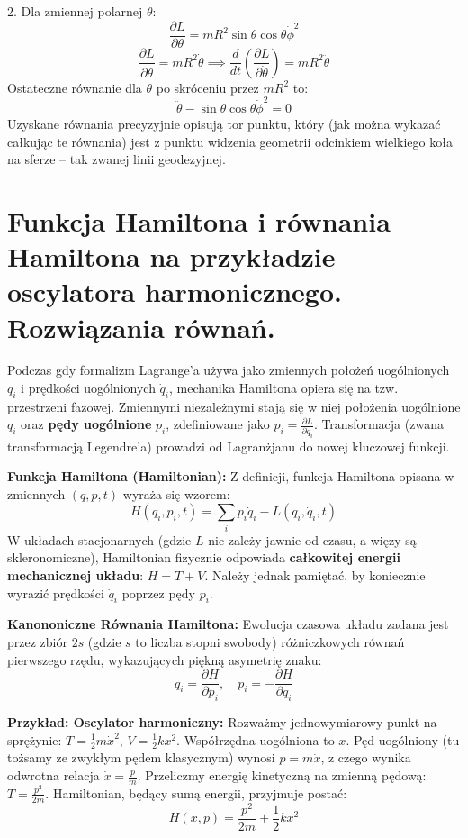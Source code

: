 \documentclass[11pt, a4paper]{article}
\begin{document}
2. Dla zmiennej polarnej $\theta$:
\[
\frac{\partial L}{\partial \theta} = m R^2 \sin\theta \cos\theta \dot{\phi}^2
\]
\[
\frac{\partial L}{\partial \dot{\theta}} = m R^2 \dot{\theta} \implies \frac{d}{dt}\left(\frac{\partial L}{\partial \dot{\theta}}\right) = m R^2 \ddot{\theta}
\]
Ostateczne równanie dla $\theta$ po skróceniu przez $mR^2$ to:
\[
\ddot{\theta} - \sin\theta \cos\theta \dot{\phi}^2 = 0
\]
Uzyskane równania precyzyjnie opisują tor punktu, który (jak można wykazać całkując te równania) jest z punktu widzenia geometrii odcinkiem wielkiego koła na sferze – tak zwanej linii geodezyjnej.

\section{Funkcja Hamiltona i równania Hamiltona na przykładzie oscylatora harmonicznego. Rozwiązania równań.}

Podczas gdy formalizm Lagrange'a używa jako zmiennych położeń uogólnionych $q_i$ i prędkości uogólnionych $\dot{q}_i$, mechanika Hamiltona opiera się na tzw. przestrzeni fazowej. Zmiennymi niezależnymi stają się w niej położenia uogólnione $q_i$ oraz \textbf{pędy uogólnione} $p_i$, zdefiniowane jako $p_i = \frac{\partial L}{\partial \dot{q}_i}$. Transformacja (zwana transformacją Legendre'a) prowadzi od Lagranżjanu do nowej kluczowej funkcji.

\textbf{Funkcja Hamiltona (Hamiltonian):}
Z definicji, funkcja Hamiltona opisana w zmiennych $(q, p, t)$ wyraża się wzorem:
\[
H(q_i, p_i, t) = \sum_i p_i \dot{q}_i - L(q_i, \dot{q}_i, t)
\]
W układach stacjonarnych (gdzie $L$ nie zależy jawnie od czasu, a więzy są skleronomiczne), Hamiltonian fizycznie odpowiada \textbf{całkowitej energii mechanicznej układu}: $H = T + V$. Należy jednak pamiętać, by koniecznie wyrazić prędkości $\dot{q}_i$ poprzez pędy $p_i$.

\textbf{Kanononiczne Równania Hamiltona:}
Ewolucja czasowa układu zadana jest przez zbiór $2s$ (gdzie $s$ to liczba stopni swobody) różniczkowych równań pierwszego rzędu, wykazujących piękną asymetrię znaku:
\[
\dot{q}_i = \frac{\partial H}{\partial p_i}, \quad \dot{p}_i = -\frac{\partial H}{\partial q_i}
\]

\textbf{Przykład: Oscylator harmoniczny:}
Rozważmy jednowymiarowy punkt na sprężynie: $T = \frac{1}{2}m\dot{x}^2$, $V = \frac{1}{2}kx^2$. 
Współrzędna uogólniona to $x$. Pęd uogólniony (tu tożsamy ze zwykłym pędem klasycznym) wynosi $p = m\dot{x}$, z czego wynika odwrotna relacja $\dot{x} = \frac{p}{m}$.
Przeliczmy energię kinetyczną na zmienną pędową: $T = \frac{p^2}{2m}$. Hamiltonian, będący sumą energii, przyjmuje postać:
\[
H(x, p) = \frac{p^2}{2m} + \frac{1}{2}kx^2
\]
\end{document}
